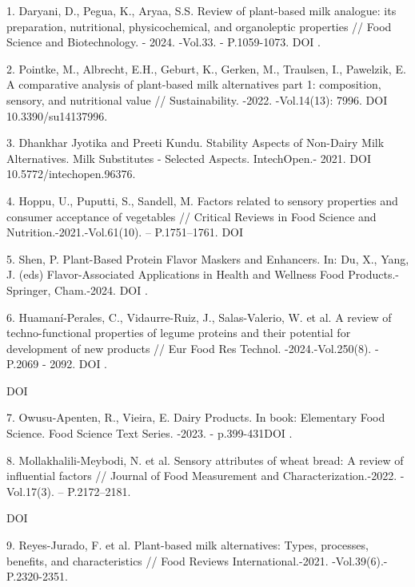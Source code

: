 \begin{references}
1. Daryani, D., Pegua, K., Aryaa, S.S. Review of plant-based milk
analogue: its preparation, nutritional, physicochemical, and
organoleptic properties // Food Science and Biotechnology. - 2024.
-Vol.33. - P.1059-1073. DOI
\href{https://doi.org/10.1007/s10068-023-01482-z}{}.

2. Pointke, M., Albrecht, E.H., Geburt, K., Gerken, M., Traulsen, I.,
Pawelzik, E. A comparative analysis of plant-based milk alternatives
part 1: composition, sensory, and nutritional value // Sustainability.
-2022. -Vol.14(13): 7996. DOI 10.3390/su14137996.

3. Dhankhar Jyotika and Preeti Kundu. Stability Aspects of Non-Dairy Milk
Alternatives. Milk Substitutes - Selected Aspects. IntechOpen.- 2021.
DOI 10.5772/intechopen.96376.

4. Hoppu, U., Puputti, S., Sandell, M. Factors related to sensory
properties and consumer acceptance of vegetables // Critical Reviews in
Food Science and Nutrition.-2021.-Vol.61(10). -- P.1751--1761. DOI
\href{https://doi.org/10.1080/10408398.2020.1767034}{}

5. Shen, P. Plant-Based Protein Flavor Maskers and Enhancers. In: Du, X.,
Yang, J. (eds) Flavor-Associated Applications in Health and Wellness
Food Products.-Springer, Cham.-2024. DOI
\href{https://doi.org/10.1007/978-3-031-51808-9_13}{}.

6. Huamaní-Perales, C., Vidaurre-Ruiz, J., Salas-Valerio, W. et al. A
review of techno-functional properties of legume proteins and their
potential for development of new products // Eur Food Res Technol.
-2024.-Vol.250(8). - P.2069 - 2092. DOI
\href{https://doi.org/10.1007/s00217-024-04536-6}{}.

DOI
\href{http://dx.doi.org/10.1007/978-3-030-65433-7_18}{}

7. Owusu-Apenten, R., Vieira, E. Dairy Products. In book: Elementary Food
Science. Food Science Text Series. -2023. - p.399-431DOI
\href{https://doi.org/10.1007/978-3-030-65433-7_18}{}.

8. Mollakhalili-Meybodi, N. et al. Sensory attributes of wheat bread: A
review of influential factors // Journal of Food Measurement and
Characterization.-2022. - Vol.17(3). -- P.2172--2181.

DOI
\href{http://dx.doi.org/10.1007/s11694-022-01765-9}{}

9. Reyes-Jurado, F. et al. Plant-based milk alternatives: Types,
processes, benefits, and characteristics // Food Reviews
International.-2021. -Vol.39(6).- P.2320-2351.


\end{references}
